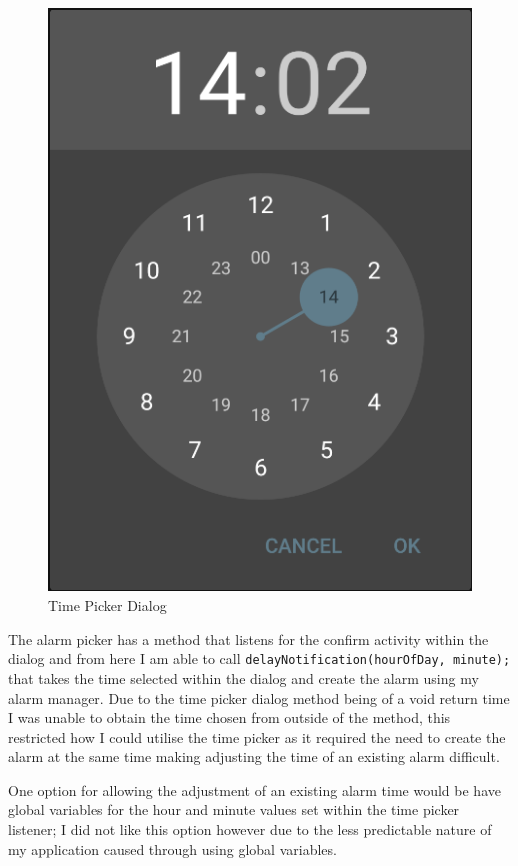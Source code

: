 \begin{figure}
  \centering
    \includegraphics[scale=0.50,keepaspectratio]{Images/components_pickers_time.png}
    \caption{Time Picker Dialog}
\end{figure}

The alarm picker has a method that listens for the confirm activity
within the dialog and from here I am able to call
\lstinline!delayNotification(hourOfDay, minute);! that takes the time
selected within the dialog and create the alarm using my alarm manager.
Due to the time picker dialog method being of a void return time I was
unable to obtain the time chosen from outside of the method, this
restricted how I could utilise the time picker as it required the need
to create the alarm at the same time making adjusting the time of an
existing alarm difficult.

One option for allowing the adjustment of an existing alarm time would
be have global variables for the hour and minute values set within the
time picker listener; I did not like this option however due to the less
predictable nature of my application caused through using global
variables.

